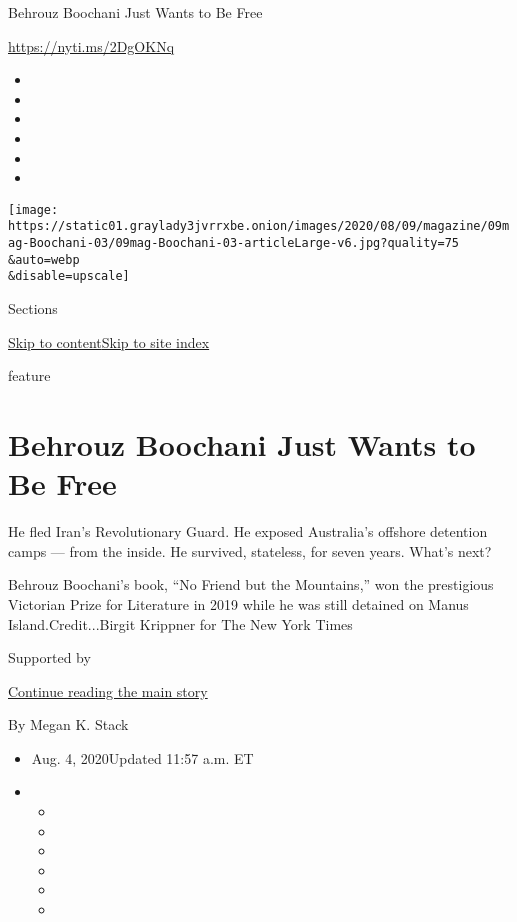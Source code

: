Behrouz Boochani Just Wants to Be Free

\url{https://nyti.ms/2DgOKNq}

\begin{itemize}
\item
\item
\item
\item
\item
\item
\end{itemize}

\texttt{[image: https://static01.graylady3jvrrxbe.onion/images/2020/08/09/magazine/09mag-Boochani-03/09mag-Boochani-03-articleLarge-v6.jpg?quality=75\\\&auto=webp\\\&disable=upscale]}

Sections

\protect\hyperlink{site-content}{Skip to
content}\protect\hyperlink{site-index}{Skip to site index}

feature

\hypertarget{behrouz-boochani-just-wants-to-be-free}{%
\section{Behrouz Boochani Just Wants to Be
Free}\label{behrouz-boochani-just-wants-to-be-free}}

He fled Iran's Revolutionary Guard. He exposed Australia's offshore
detention camps --- from the inside. He survived, stateless, for seven
years. What's next?

Behrouz Boochani's book, ``No Friend but the Mountains,'' won the
prestigious Victorian Prize for Literature in 2019 while he was still
detained on Manus Island.Credit...Birgit Krippner for The New York Times

Supported by

\protect\hyperlink{after-sponsor}{Continue reading the main story}

By Megan K. Stack

\begin{itemize}
\item
  Aug. 4, 2020Updated 11:57 a.m. ET
\item
  \begin{itemize}
  \item
  \item
  \item
  \item
  \item
  \item
  \end{itemize}
\end{itemize}

